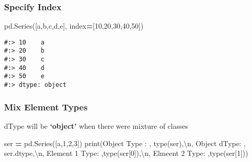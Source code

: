 \documentclass[
]{book}
\newenvironment{Shaded}{\begin{snugshade}}{\end{snugshade}}
\newcommand{\BuiltInTok}[1]{#1}
\newcommand{\CharTok}[1]{\textcolor[rgb]{0.5,0.5,0.5}{#1}}
\newcommand{\DecValTok}[1]{\textcolor[rgb]{0.06,0.06,0.06}{#1}}
\newcommand{\NormalTok}[1]{#1}
\newcommand{\OperatorTok}[1]{\textcolor[rgb]{0.43,0.43,0.43}{\textbf{#1}}}
\newcommand{\StringTok}[1]{\textcolor[rgb]{0.5,0.5,0.5}{#1}}
\begin{document}
\hypertarget{specify-index}{%
\subsubsection{Specify Index}\label{specify-index}}

\begin{Shaded}
\begin{Highlighting}[]
\NormalTok{pd.Series([}\StringTok{\textquotesingle{}a\textquotesingle{}}\NormalTok{,}\StringTok{\textquotesingle{}b\textquotesingle{}}\NormalTok{,}\StringTok{\textquotesingle{}c\textquotesingle{}}\NormalTok{,}\StringTok{\textquotesingle{}d\textquotesingle{}}\NormalTok{,}\StringTok{\textquotesingle{}e\textquotesingle{}}\NormalTok{], index}\OperatorTok{=}\NormalTok{[}\DecValTok{10}\NormalTok{,}\DecValTok{20}\NormalTok{,}\DecValTok{30}\NormalTok{,}\DecValTok{40}\NormalTok{,}\DecValTok{50}\NormalTok{])}
\end{Highlighting}
\end{Shaded}

\begin{verbatim}
#:> 10    a
#:> 20    b
#:> 30    c
#:> 40    d
#:> 50    e
#:> dtype: object
\end{verbatim}

\hypertarget{mix-element-types}{%
\subsubsection{Mix Element Types}\label{mix-element-types}}

dType will be \textbf{`object'} when there were mixture of classes

\begin{Shaded}
\begin{Highlighting}[]
\NormalTok{ser }\OperatorTok{=}\NormalTok{ pd.Series([}\StringTok{\textquotesingle{}a\textquotesingle{}}\NormalTok{,}\DecValTok{1}\NormalTok{,}\DecValTok{2}\NormalTok{,}\DecValTok{3}\NormalTok{])}
\BuiltInTok{print}\NormalTok{(}\StringTok{\textquotesingle{}Object Type :  \textquotesingle{}}\NormalTok{, }\BuiltInTok{type}\NormalTok{(ser),}\StringTok{\textquotesingle{}}\CharTok{\textbackslash{}n}\StringTok{\textquotesingle{}}\NormalTok{,}
      \StringTok{\textquotesingle{}Object dType:  \textquotesingle{}}\NormalTok{, ser.dtype,}\StringTok{\textquotesingle{}}\CharTok{\textbackslash{}n}\StringTok{\textquotesingle{}}\NormalTok{,}
      \StringTok{\textquotesingle{}Element 1 Type: \textquotesingle{}}\NormalTok{,}\BuiltInTok{type}\NormalTok{(ser[}\DecValTok{0}\NormalTok{]),}\StringTok{\textquotesingle{}}\CharTok{\textbackslash{}n}\StringTok{\textquotesingle{}}\NormalTok{,}
      \StringTok{\textquotesingle{}Elmeent 2 Type: \textquotesingle{}}\NormalTok{,}\BuiltInTok{type}\NormalTok{(ser[}\DecValTok{1}\NormalTok{]))}
\end{Highlighting}
\end{Shaded}
\end{document}
